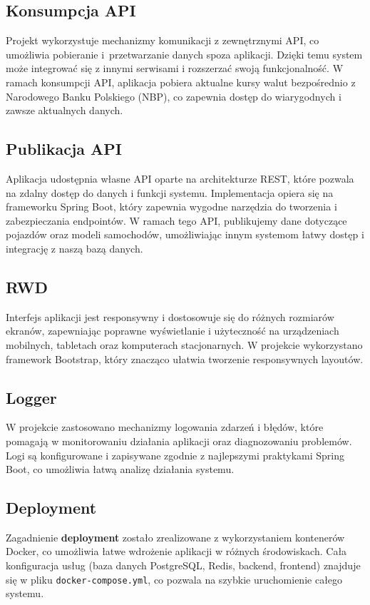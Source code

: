 \documentclass[12pt]{article}
\begin{document}
	\subsection{Konsumpcja API}
	Projekt wykorzystuje mechanizmy komunikacji z zewnętrznymi API, co umożliwia pobieranie i~przetwarzanie danych spoza aplikacji. Dzięki temu system może integrować się z innymi serwisami i rozszerzać swoją funkcjonalność. W ramach konsumpcji API, aplikacja pobiera aktualne kursy walut bezpośrednio z Narodowego Banku Polskiego (NBP), co zapewnia dostęp do wiarygodnych i zawsze aktualnych danych.
	
	\subsection{Publikacja API}
	Aplikacja udostępnia własne API oparte na architekturze REST, które pozwala na zdalny dostęp do danych i funkcji systemu. Implementacja opiera się na frameworku Spring Boot, który zapewnia wygodne narzędzia do tworzenia i zabezpieczania endpointów. W ramach tego API, publikujemy dane dotyczące pojazdów oraz modeli samochodów, umożliwiając innym systemom łatwy dostęp i integrację z naszą bazą danych.
	
	\subsection{RWD}
	Interfejs aplikacji jest responsywny i dostosowuje się do różnych rozmiarów ekranów, zapewniając poprawne wyświetlanie i użyteczność na urządzeniach mobilnych, tabletach oraz komputerach stacjonarnych. W projekcie wykorzystano framework Bootstrap, który znacząco ułatwia tworzenie responsywnych layoutów.
	
	\subsection{Logger}
	W projekcie zastosowano mechanizmy logowania zdarzeń i błędów, które pomagają w monitorowaniu działania aplikacji oraz diagnozowaniu problemów. Logi są konfigurowane i zapisywane zgodnie z najlepszymi praktykami Spring Boot, co umożliwia łatwą analizę działania systemu.
	
	\subsection{Deployment}
	Zagadnienie \textbf{deployment} zostało zrealizowane z wykorzystaniem kontenerów Docker, co umożliwia łatwe wdrożenie aplikacji w różnych środowiskach. Cała konfiguracja usług (baza danych PostgreSQL, Redis, backend, frontend) znajduje się w pliku \texttt{docker-compose.yml}, co pozwala na szybkie uruchomienie całego systemu.
	
	\newpage
	\listoffigures
	
	\lstlistoflistings
	
\end{document}
